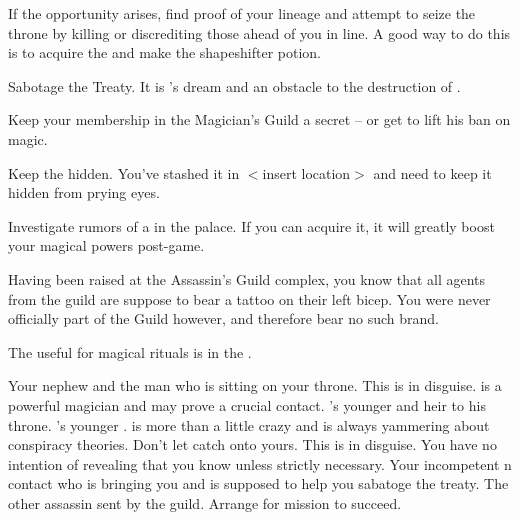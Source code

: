 \documentclass[char]{NeptuneBall}
\begin{document}
\begin{itemz}[Goals]
  \item If the opportunity arises, find proof of your lineage and attempt to seize the throne by killing or discrediting those ahead of you in line. A good way to do this is to acquire the \iHemlock{} and make the shapeshifter potion.
  \item Sabotage the Treaty. It is \cKing{}'s dream and an obstacle to the destruction of \pAtlantis{}.
  \item Keep your membership in the Magician's Guild a secret -- or get \cKing{\King} \cKing{} to lift his ban on magic.
  \item Keep the \iMusicBox{} hidden. You've stashed it in $<$insert location$>$ and need to keep it hidden from prying eyes.
  \item Investigate rumors of a \iGlowShell{} in the palace. If you can acquire it, it will greatly boost your magical powers post-game.
\end{itemz}

\begin{itemz}[Notes]
  \item Having been raised at the Assassin's Guild complex, you know that all agents from the guild are suppose to bear a tattoo on their left bicep. You were never officially part of the Guild however, and therefore bear no such brand.
	\item The \sRunicCircle{} useful for magical rituals is in the \pCaves{\MYname}.
\end{itemz}

\begin{contacts}
  \contact{\cKing{}} Your nephew and the man who is sitting on your throne.
  \contact{\cWitch{\MYname}} This is \cWitch{} in disguise. \cWitch{\They} is a powerful magician and may prove a crucial contact.
  \contact{\cPrincess{}} \cKing{}'s younger \cPrincess{\offspring} and heir to his throne.
  \contact{\cPlant{}} \cKing{}'s younger \cPlant{\sibling}. \cPlant{\they} is more than a little crazy and is always yammering about conspiracy theories. Don't let \cPlant{\them} catch onto yours.
  \contact{\cQueen{\MYname}} This is \cQueen{} in disguise. You have no intention of revealing that you know \cQueen{\them} unless strictly necessary.
  \contact{\cSpy{}} Your incompetent \pPacifica{}n contact who is bringing you \iHemlock{} and is supposed to help you sabatoge the treaty.
	\contact{\cDiplomat{}} The other assassin sent by the guild. Arrange for \cDiplomat{\their} mission to succeed.
\end{contacts}
\end{document}
